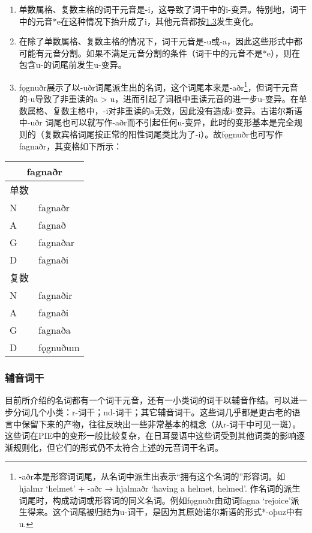 \begin{enumerate}
\def\labelenumi{\arabic{enumi})}
\item
  单数属格、复数主格的词干元音是-i，这导致了词干中的i-变异。特别地，词干中的元音*e在这种情况下抬升成了i，其他元音都按\hyperref[ux53d8ux5143ux97f3]{1.3}发生变化。
\item
  在除了单数属格、复数主格的情况下，词干元音是-u或-a，因此这些形式中都可能有元音分割。如果不满足元音分割的条件（词干中的元音不是*e），则在包含u-的词尾前发生u-变异。
\item
  fǫgnuðr展示了以-uðr词尾派生出的名词，这个词尾本来是-aðr\footnote{-aðr本是形容词词尾，从名词中派生出表示``拥有这个名词的''形容词。如hjalmr
    `helmet' + -aðr → hjalmaðr `having a helmet, helmed'.
    作名词的派生词尾时，构成动词或形容词的同义名词。例如fǫgnuðr由动词fagna
    `rejoice'派生得来。这个词尾被归结为u-词干，是因为其原始诺尔斯语的形式*-oþuz中有u.}，但词干元音的-u导致了非重读的a
  \textgreater{}
  u，进而引起了词根中重读元音的进一步u-变异。在单数属格、复数主格中，-i对非重读的a无效，因此没有造成i-变异。古诺尔斯语中-uðr
  词尾也可以就写作-aðr而不引起任何u-变异，此时的变形基本是完全规则的（复数宾格词尾按正常的阳性词尾类比为了-i）。故fǫgnuðr也可写作fagnaðr，其变格如下所示：
\end{enumerate}

\begin{longtable}{ll}
\toprule
\multicolumn{2}{c}{fagnaðr} \\
\midrule
\endhead
\bottomrule
\endfoot
单数 & \\
N & fagnaðr \\
A & fagnað \\
G & fagnaðar \\
D & fagnaði \\
复数 & \\
N & fagnaðir \\
A & fagnaði \\
G & fagnaða \\
D & fǫgnuðum \\
\end{longtable}

\subsubsection{辅音词干}\label{ux8f85ux97f3ux8bcdux5e72}

目前所介绍的名词都有一个词干元音，还有一小类词的词干以辅音作结。可以进一步分词几个小类：r-词干；nd-词干；其它辅音词干。这些词几乎都是更古老的语言中保留下来的产物，往往反映出一些非常基本的概念（从r-词干中可见一斑）。这些词在PIE中的变形一般比较复杂，在日耳曼语中这些词受到其他词类的影响逐渐规则化，但它们的形式仍不太符合上述的元音词干名词。


